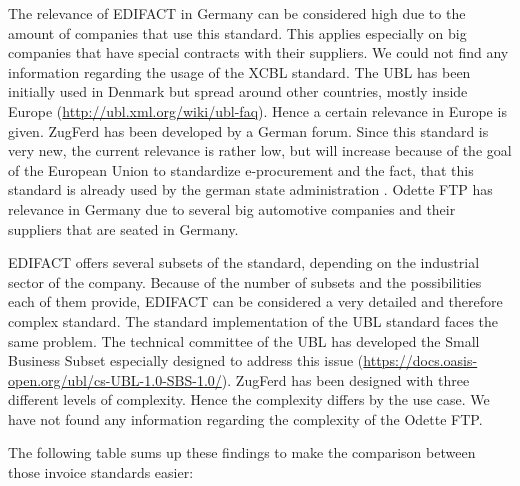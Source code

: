 The relevance of EDIFACT in Germany can be considered high due to the amount of companies that use this standard. This applies especially on big companies that have special contracts with their suppliers. We could not find any information regarding the usage of the XCBL standard. The UBL has been initially used in Denmark but spread around other countries, mostly inside Europe (\url{http://ubl.xml.org/wiki/ubl-faq}). Hence a certain relevance in Europe is given. ZugFerd has been developed by a German forum. Since this standard is very new, the current relevance is rather low, but will increase because of the goal of the European Union to standardize e-procurement and the fact, that this standard is already used by the german state administration \cite{awv16}. Odette FTP has relevance in Germany due to several big automotive companies and their suppliers that are seated in Germany. 

EDIFACT offers several subsets of the standard, depending on the industrial sector of the company. Because of the number of subsets and the possibilities each of them provide, EDIFACT can be considered a very detailed and therefore complex standard. The standard implementation of the UBL standard faces the same problem. The technical committee of the UBL has developed the Small Business Subset especially designed to address this issue (\url{https://docs.oasis-open.org/ubl/cs-UBL-1.0-SBS-1.0/}). ZugFerd has been designed with three different levels of complexity. Hence the complexity differs by the use case. We have not found any information regarding the complexity of the Odette FTP.

The following table sums up these findings to make the comparison between those invoice standards easier:

